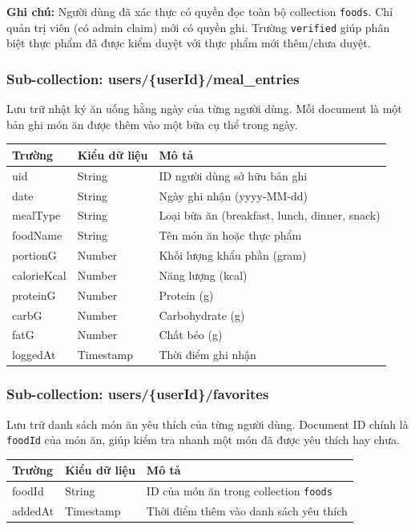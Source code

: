 \textbf{Ghi chú:} Người dùng đã xác thực có quyền đọc toàn bộ collection \texttt{foods}. Chỉ quản trị viên (có admin claim) mới có quyền ghi. Trường \texttt{verified} giúp phân biệt thực phẩm đã được kiểm duyệt với thực phẩm mới thêm/chưa duyệt.

\subsubsection{Sub-collection: users/\{userId\}/meal\_entries}

Lưu trữ nhật ký ăn uống hằng ngày của từng người dùng. Mỗi document là một bản ghi món ăn được thêm vào một bữa cụ thể trong ngày.

\begin{longtable}{|p{3.5cm}|p{3.5cm}|p{7.5cm}|}
    \hline
    \textbf{Trường} & \textbf{Kiểu dữ liệu} & \textbf{Mô tả} \\
    \hline
    \endhead
    \hline
    \endfoot
    uid & String & ID người dùng sở hữu bản ghi \\
    \hline
    date & String & Ngày ghi nhận (yyyy-MM-dd) \\
    \hline
    mealType & String & Loại bữa ăn (breakfast, lunch, dinner, snack) \\
    \hline
    foodName & String & Tên món ăn hoặc thực phẩm \\
    \hline
    portionG & Number & Khối lượng khẩu phần (gram) \\
    \hline
    calorieKcal & Number & Năng lượng (kcal) \\
    \hline
    proteinG & Number & Protein (g) \\
    \hline
    carbG & Number & Carbohydrate (g) \\
    \hline
    fatG & Number & Chất béo (g) \\
    \hline
    loggedAt & Timestamp & Thời điểm ghi nhận \\
    \hline
\end{longtable}

\subsubsection{Sub-collection: users/\{userId\}/favorites}

Lưu trữ danh sách món ăn yêu thích của từng người dùng. Document ID chính là \texttt{foodId} của món ăn, giúp kiểm tra nhanh một món đã được yêu thích hay chưa.

\begin{longtable}{|p{3.5cm}|p{3.5cm}|p{7.5cm}|}
    \hline
    \textbf{Trường} & \textbf{Kiểu dữ liệu} & \textbf{Mô tả} \\
    \hline
    \endhead
    \hline
    \endfoot
    foodId & String & ID của món ăn trong collection \texttt{foods} \\
    \hline
    addedAt & Timestamp & Thời điểm thêm vào danh sách yêu thích \\
    \hline
\end{longtable}

